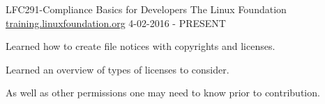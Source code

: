 


\begin{cventries}


\cventry
{LFC291-Compliance Basics for Developers} %
{The Linux Foundation} %
{\href{http://training.linuxfoundation.org}{training.linuxfoundation.org}} %
{4-02-2016 - PRESENT} %
{ %
\begin{cvitems}
\item {Learned how to create file notices with copyrights and licenses.}
\item {Learned an overview of types of licenses to consider.}
\item {As well as other permissions one may need to know prior to contribution.}
\end{cvitems}
}


\end{cventries}
